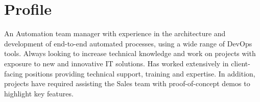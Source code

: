 \section{Profile}

An Automation team manager with experience in the architecture 
and development of end-to-end automated processes, using a wide 
range of DevOps tools. Always looking to increase technical 
knowledge and work on projects with exposure to new and innovative 
IT solutions. Has worked extensively in client-facing positions 
providing technical support, training and expertise. In addition, 
projects have required assisting the Sales team with
proof-of-concept demos to highlight key features.

\closesection{}

